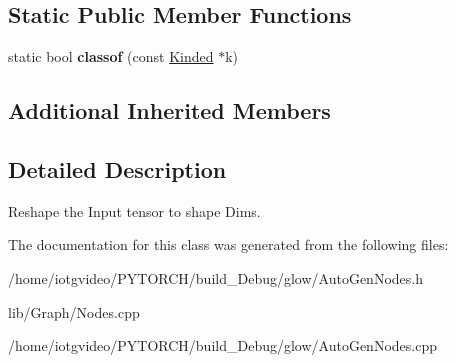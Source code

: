 \subsection*{Static Public Member Functions}
\begin{DoxyCompactItemize}
\item 
\mbox{\label{classglow_1_1_reshape_node_aff7c2d67025f3309a191a3b277ba669b}} 
static bool {\bfseries classof} (const \hyperlink{classglow_1_1_kinded}{Kinded} $\ast$k)
\end{DoxyCompactItemize}
\subsection*{Additional Inherited Members}


\subsection{Detailed Description}
Reshape the Input tensor to shape Dims. 

The documentation for this class was generated from the following files\+:\begin{DoxyCompactItemize}
\item 
/home/iotgvideo/\+P\+Y\+T\+O\+R\+C\+H/build\+\_\+\+Debug/glow/Auto\+Gen\+Nodes.\+h\item 
lib/\+Graph/Nodes.\+cpp\item 
/home/iotgvideo/\+P\+Y\+T\+O\+R\+C\+H/build\+\_\+\+Debug/glow/Auto\+Gen\+Nodes.\+cpp\end{DoxyCompactItemize}

